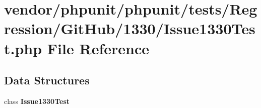 \section{vendor/phpunit/phpunit/tests/\+Regression/\+Git\+Hub/1330/\+Issue1330\+Test.php File Reference}
\label{_issue1330_test_8php}
\subsection*{Data Structures}
\begin{DoxyCompactItemize}
\item 
class {\bf Issue1330\+Test}
\end{DoxyCompactItemize}
